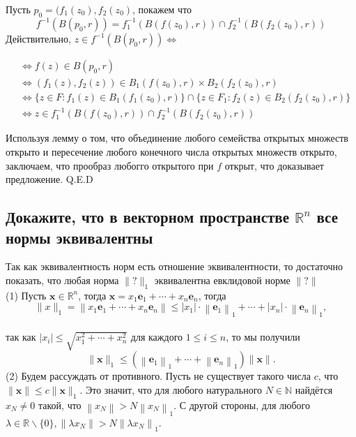 \documentclass[a4paper]{article}
\begin{document}
Пусть $p_0=(f_1(z_0),f_2(z_0)$, покажем что $$f^{-1}(B(p_0, r))=f_1^{-1}(B(f(z_0), r))\cap f_2^{-1}(B(f_2(z_0), r))$$
Действительно, $z\in f^{-1}(B(p_0, r))\Longleftrightarrow$

$$
\begin{aligned}
& \Longleftrightarrow f(z)\in B(p_0,r)\\
& \Longleftrightarrow (f_1(z), f_2(z))\in B_1(f(z_0), r)\times B_2(f_2(z_0), r) \\
& \Longleftrightarrow \{z\in F: f_1(z)\in B_1(f_1(z_0), r)\}\cap\{z\in F_1: f_2(z)\in B_2(f_2(z_0), r)\}\\
& \Longleftrightarrow z\in f_1^{-1}(B(f(z_0), r))\cap f_2^{-1}(B(f_2(z_0), r))
\end{aligned}
$$

Используя лемму о том, что объединение любого семейства открытых множеств открыто и пересечение любого конечного числа открытых множеств открыто, заключаем, что прообраз любогго открытого при $f$ открыт, что доказывает предложение. Q.E.D


\subsection{Докажите, что в векторном пространстве $\mathbb{R}^n$ все нормы эквивалентны}
Так как эквивалентность норм есть отношение эквивалентности, то достаточно показать, что любая норма $\|?\|_1$ эквивалентна евклидовой норме $\|?\|$\\[2mm]
(1) Пусть $\mathbf{x} \in \mathbb{R}^n$, тогда $\mathbf{x}=x_1 \mathbf{e}_1+\cdots+x_n \mathbf{e}_n$, тогда
$$
\|x\|_1=\left\|x_1 \mathbf{e}_1+\cdots+x_n \mathbf{e}_n\right\| \leq\left|x_1\right| \cdot\left\|\mathbf{e}_1\right\|_1+\cdots+\left|x_n\right| \cdot\left\|\mathbf{e}_n\right\|_1,
$$\\
так как $\left|x_i\right| \leq \sqrt{x_1^2+\cdots+x_n^2}$ для каждого $1 \leq i \leq n$, то мы получили
$$
\|\mathbf{x}\|_1 \leq\left(\left\|\mathbf{e}_1\right\|_1+\cdots+\left\|\mathbf{e}_n\right\|_1\right)\|\mathbf{x}\| .
$$
(2) Будем рассуждать от противного. Пусть не существует такого числа $c$, что $\|\mathbf{x}\| \leq c\|\mathbf{x}\|_1$. Это значит, что для любого натурального $N \in \mathbb{N}$ найдётся $x_N \neq 0$ такой, что $\left\|x_N\right\|>N\left\|x_N\right\|_1$. С другой стороны, для любого $\lambda \in \mathbb{R} \backslash\{0\},\left\|\lambda x_N\right\|>N\left\|\lambda x_N\right\|_1$.
\end{document}
